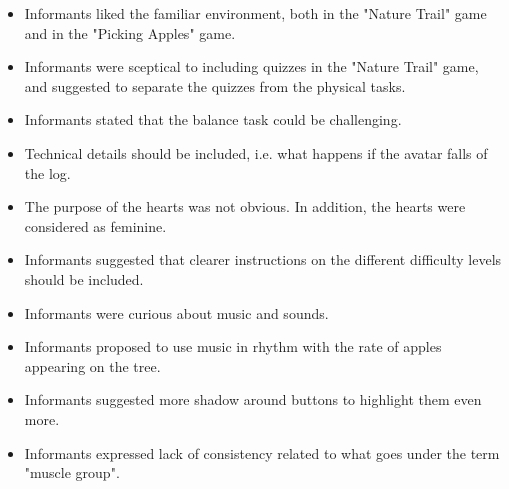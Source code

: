 \begin{itemize}
\item Informants liked the familiar environment, both in the "Nature Trail" game and in the "Picking Apples" game.
\item Informants were sceptical to including quizzes in the "Nature Trail" game, and suggested to separate the quizzes from the physical tasks.
\item Informants stated that the balance task could be challenging.
\item Technical details should be included, i.e. what happens if the avatar falls of the log.
\item The purpose of the hearts was not obvious. In addition, the hearts were considered as feminine.
\item Informants suggested that clearer instructions on the different difficulty levels should be included.
\item Informants were curious about music and sounds. 
\item Informants proposed to use music in rhythm with the rate of apples appearing on the tree. 
\item Informants suggested more shadow around buttons to highlight them even more.
\item Informants expressed lack of consistency related to what goes under the term "muscle group".

\end{itemize}



